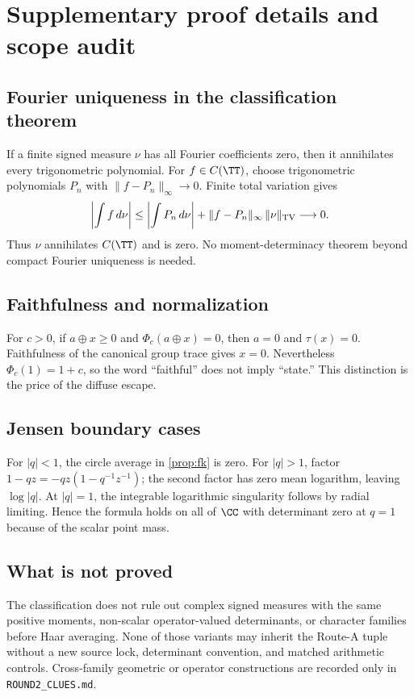 \section{Supplementary proof details and scope audit}
\label{app:proofs}

\subsection{Fourier uniqueness in the classification theorem}

If a finite signed measure $\nu$ has all Fourier coefficients zero, then it
annihilates every trigonometric polynomial.  For $f\in C(\TT)$, choose
trigonometric polynomials $P_n$ with $\|f-P_n\|_\infty\to0$.  Finite total
variation gives
\[
 \left|\int f\,d\nu\right|
 \le \left|\int P_n\,d\nu\right|
     +\|f-P_n\|_\infty\,\|\nu\|_{\rm TV}\longrightarrow0.
\]
Thus $\nu$ annihilates $C(\TT)$ and is zero.  No moment-determinacy theorem
beyond compact Fourier uniqueness is needed.

\subsection{Faithfulness and normalization}

For $c>0$, if $a\oplus x\ge0$ and $\Phi_c(a\oplus x)=0$, then $a=0$ and
$\tau(x)=0$.  Faithfulness of the canonical group trace gives $x=0$.
Nevertheless $\Phi_c(1)=1+c$, so the word ``faithful'' does not imply
``state.''  This distinction is the price of the diffuse escape.

\subsection{Jensen boundary cases}

For $|q|<1$, the circle average in \cref{prop:fk} is zero.  For $|q|>1$,
factor $1-qz=-qz(1-q^{-1}z^{-1})$; the second factor has zero mean logarithm,
leaving $\log|q|$.  At $|q|=1$, the integrable logarithmic singularity follows
by radial limiting.  Hence the formula holds on all of $\CC$ with determinant
zero at $q=1$ because of the scalar point mass.

\subsection{What is not proved}

The classification does not rule out complex signed measures with the same
positive moments, non-scalar operator-valued determinants, or character
families before Haar averaging.  None of those variants may inherit the
Route-A tuple without a new source lock, determinant convention, and matched
arithmetic controls.  Cross-family geometric or operator constructions are
recorded only in \texttt{ROUND2\_CLUES.md}.
